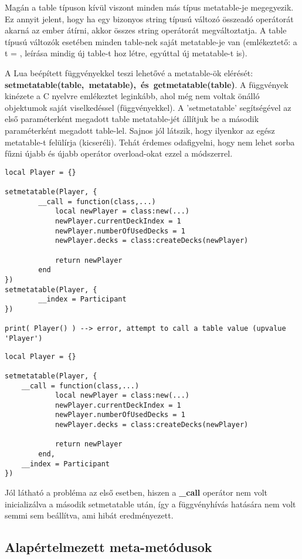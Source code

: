 Magán a table típuson kívül viszont minden más típus metatable-je megegyezik. Ez annyit jelent, hogy ha egy bizonyos string típusú változó összeadó operátorát akarná az ember átírni, akkor összes string operátorát megváltoztatja. A table típusú változók esetében minden table-nek saját metatable-je van (emlékeztető: a t = { }, leírása mindig új table-t hoz létre, egyúttal új metatable-t is).

A Lua beépített függvényekkel teszi lehetővé a metatable-ök elérését: \mbox{\textbf{setmetatable(table, metatable), és getmetatable(table)}}. A függvények kinézete a C nyelvre emlékeztet leginkább, ahol még nem voltak önálló objektumok saját viselkedéssel (függvényekkel). A 'setmetatable' segítségével az első paraméterként megadott table metatable-jét állítjuk be a második paraméterként megadott table-lel. Sajnos jól látszik, hogy ilyenkor az egész metatable-t felülírja (kicseréli). Tehát érdemes odafigyelni, hogy nem lehet sorba fűzni újabb és újabb operátor overload-okat ezzel a módszerrel. 

\newpage
\scriptsize
\begin{lstlisting}
local Player = {}

setmetatable(Player, {
		__call = function(class,...)
			local newPlayer = class:new(...)
			newPlayer.currentDeckIndex = 1
			newPlayer.numberOfUsedDecks = 1
			newPlayer.decks = class:createDecks(newPlayer)

			return newPlayer
		end
})
setmetatable(Player, {
		__index = Participant
})

print( Player() ) --> error, attempt to call a table value (upvalue 'Player')
\end{lstlisting} 
\normalsize
\scriptsize
\label{code:l_call}
\begin{lstlisting}
local Player = {}

setmetatable(Player, {
	__call = function(class,...)
			local newPlayer = class:new(...)
			newPlayer.currentDeckIndex = 1
			newPlayer.numberOfUsedDecks = 1
			newPlayer.decks = class:createDecks(newPlayer)

			return newPlayer
		end,
	__index = Participant
})
\end{lstlisting}
\normalsize
Jól látható a probléma az első esetben, hiszen a \textbf{\_call} operátor nem volt inicializálva a második setmetatable után, így a függvényhívás hatására nem volt semmi sem beállítva, ami hibát eredményezett.

\newpage

\subsection{Alapértelmezett meta-metódusok}
\label{subsec:l_metaM}

